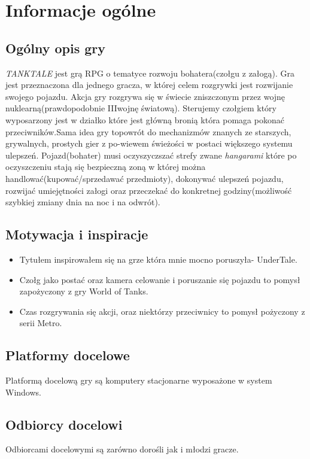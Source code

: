 \documentclass{article}
\begin{document}
\newpage

\section{Informacje ogólne}
    \subsection{Ogólny opis gry}
    \emph{TANKTALE} jest grą RPG o tematyce rozwoju bohatera(czołgu z załogą). Gra jest przeznaczona dla jednego gracza, w której celem rozgrywki jest rozwijanie swojego pojazdu. Akcja gry rozgrywa się w świecie zniszczonym przez wojnę nuklearną(prawdopodobnie IIIwojnę światową). Sterujemy czołgiem który wyposarzony jest w działko które jest główną bronią która pomaga pokonać przeciwników.Sama  idea  gry  topowrót do mechanizmów znanych ze starszych, grywalnych, prostych gier z po-wiewem świeżości w postaci większego systemu ulepszeń. Pojazd(bohater) musi oczyszyczszać strefy zwane \emph{hangarami} które po oczyszczeniu stają się bezpieczną zoną w której można handlować(kupować/sprzedawać przedmioty), dokonywać ulepszeń pojazdu, rozwijać umiejętności załogi oraz przeczekać do konkretnej godziny(możliwość szybkiej zmiany dnia na noc i na odwrót). 
    
    \subsection{Motywacja i inspiracje}
    \begin{itemize}
        \item Tytułem inspirowałem się na grze która mnie mocno poruszyła- UnderTale.
        \item Czołg jako postać oraz kamera celowanie i poruszanie się pojazdu to pomysł zapożyczony z gry World of Tanks.
        \item Czas rozgrywania się akcji, oraz niektórzy przeciwnicy to pomysł pożyczony z serii Metro.
    \end{itemize}
    \subsection{Platformy docelowe}
    Platformą docelową gry są komputery stacjonarne wyposażone w system Windows.
    \subsection{Odbiorcy docelowi}
    Odbiorcami docelowymi są zarówno dorośli jak i młodzi gracze.
\end{document}
